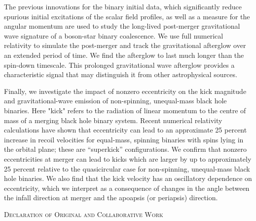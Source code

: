 \documentclass[11pt]{report}  %
\numberwithin{equation}{section}
\begin{document}
The previous innovations for the binary initial data, which significantly reduce spurious initial excitations of the scalar field profiles, as well as a measure for the angular momentum are used to study the long-lived post-merger gravitational wave signature of a boson-star binary coalescence. We use full numerical relativity to simulate the post-merger and track the gravitational afterglow over an extended period of time. We find the afterglow to last much longer than the spin-down timescale. This prolonged gravitational wave afterglow provides a characteristic signal that may distinguish it from other astrophysical sources.

Finally, we investigate the impact of nonzero eccentricity on the kick magnitude and gravitational-wave emission of non-spinning, unequal-mass black hole binaries. Here "kick" refers to the radiation of linear momentum to the centre of mass of a merging black hole binary system. Recent numerical relativity calculations have shown that eccentricity can lead to an approximate 25 percent increase in recoil velocities for equal-mass, spinning binaries with spins lying in the orbital plane; these are “superkick” configurations. We confirm that nonzero eccentricities at merger can lead to kicks which are larger by up to approximately 25 percent relative to the quasicircular case for non-spinning, unequal-mass black hole binaries. We also find that the kick velocity has an oscillatory dependence on eccentricity, which we interpret as a consequence of changes in the angle between the infall direction at merger and the apoapsis (or periapsis) direction.
\newpage

  {\centering
  \scshape\LARGE Declaration of Original and Collaborative Work  \par}
  \vspace{1cm}
\end{document}
